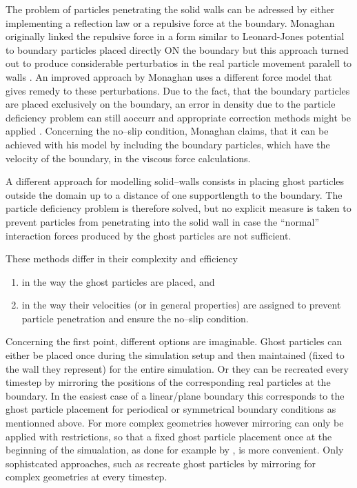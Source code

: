 \documentclass{report}
\begin{document}
The problem of particles penetrating the solid walls can be adressed by either implementing a reflection law or a repulsive force at the boundary. Monaghan originally linked the repulsive force in a form similar to Leonard-Jones potential to boundary particles placed directly ON the boundary \cite{Monaghan1994} but this approach turned out to produce considerable perturbatios in the real particle movement paralell to walls \cite{Monaghan2005}. An improved approach by Monaghan uses a different force model \cite{Monaghan2004} that gives remedy to these perturbations. Due to the fact, that the boundary particles are placed exclusively on the boundary, an error in density due to the particle deficiency problem can still aoccurr and appropriate correction methods might be applied \cite{Monaghan2004}. Concerning the no--slip condition, Monaghan claims, that it can be achieved with his model by including the boundary particles, which have the velocity of the boundary, in the viscous force calculations. 

A different approach for modelling solid--walls consists in placing ghost particles outside the domain up to a distance of one supportlength to the boundary. The particle deficiency problem is therefore solved, but no explicit measure is taken to prevent particles from penetrating into the solid wall in case the ``normal'' interaction forces produced by the ghost particles are not sufficient.

 These methods differ in their complexity and efficiency 
\begin{enumerate}
  \item in the way the ghost particles are placed, and
\item in the way their velocities (or in general properties) are assigned to prevent particle penetration and ensure the no--slip condition.
 \end{enumerate}

Concerning the first point, different options are imaginable. Ghost particles can either be placed once during the simulation setup and then maintained (fixed to the wall they represent) for the entire simulation. Or they can be recreated every timestep by mirroring the positions of the corresponding real particles at the boundary. In the easiest case of a linear/plane boundary this corresponds to the ghost particle placement for periodical or symmetrical boundary conditions as mentionned above.
For more complex geometries however mirroring can only be applied with restrictions, so that a fixed ghost particle placement once at the beginning of the simualation, as done for example by \cite{Morris1997, Morris1999}, is more convenient. Only sophistcated approaches, such as \cite{Yildit2009} recreate ghost particles by mirroring for complex geometries at every timestep.
\end{document}
